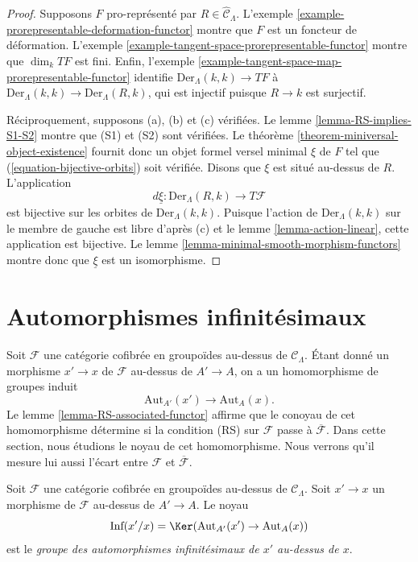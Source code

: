 \begin{proof}
Supposons $F$ pro-représenté par
$R \in \widehat{\mathcal{C}}_\Lambda$. L'exemple
\ref{example-prorepresentable-deformation-functor} montre que $F$ est un
foncteur de déformation. L'exemple
\ref{example-tangent-space-prorepresentable-functor} montre que
$\dim_k TF$ est fini. Enfin, l'exemple
\ref{example-tangent-space-map-prorepresentable-functor} identifie
$\text{Der}_\Lambda(k, k) \to TF$ à
$\text{Der}_\Lambda(k, k) \to \text{Der}_\Lambda(R, k)$, qui est injectif
puisque $R \to k$ est surjectif.

\medskip\noindent
Réciproquement, supposons (a), (b) et (c) vérifiées. Le lemme
\ref{lemma-RS-implies-S1-S2} montre que (S1) et (S2) sont vérifiées. Le théorème
\ref{theorem-miniversal-object-existence} fournit donc un objet formel versel
minimal $\xi$ de $F$ tel que (\ref{equation-bijective-orbits}) soit vérifiée.
Disons que $\xi$ est situé au-dessus de $R$. L'application
$$
d\underline{\xi} : \text{Der}_\Lambda(R, k) \to T\mathcal{F}
$$
est bijective sur les orbites de $\text{Der}_\Lambda(k, k)$. Puisque l'action
de $\text{Der}_\Lambda(k, k)$ sur le membre de gauche est libre d'après (c) et
le lemme \ref{lemma-action-linear}, cette application est bijective. Le lemme
\ref{lemma-minimal-smooth-morphism-functors} montre donc que
$\underline{\xi}$ est un isomorphisme.
\end{proof}




\section{Automorphismes infinitésimaux}
\label{section-infinitesimal-automorphisms}

\noindent
Soit $\mathcal{F}$ une catégorie cofibrée en groupoïdes au-dessus de
$\mathcal{C}_\Lambda$. Étant donné un morphisme $x' \to x$ de $\mathcal{F}$
au-dessus de $A' \to A$, on a un homomorphisme de groupes induit
$$
\text{Aut}_{A'}(x') \to \text{Aut}_A(x).
$$
Le lemme \ref{lemma-RS-associated-functor} affirme que le conoyau de cet
homomorphisme détermine si la condition (RS) sur $\mathcal{F}$ passe à
$\overline{\mathcal{F}}$. Dans cette section, nous étudions le noyau de cet
homomorphisme. Nous verrons qu'il mesure lui aussi l'écart entre $\mathcal{F}$
et $\overline{\mathcal{F}}$.

\begin{definition}
\label{definition-relative-infinitesimal-auts}
Soit $\mathcal{F}$ une catégorie cofibrée en groupoïdes au-dessus de $\mathcal
C_\Lambda$. Soit $x' \to x$ un morphisme de $\mathcal{F}$ au-dessus de
$A' \to A$. Le noyau
$$
\text{Inf}(x'/x) = \Ker(\text{Aut}_{A'}(x') \to \text{Aut}_A(x))
$$
est le {\it groupe des automorphismes infinitésimaux de $x'$ au-dessus de $x$}.
\end{definition}

